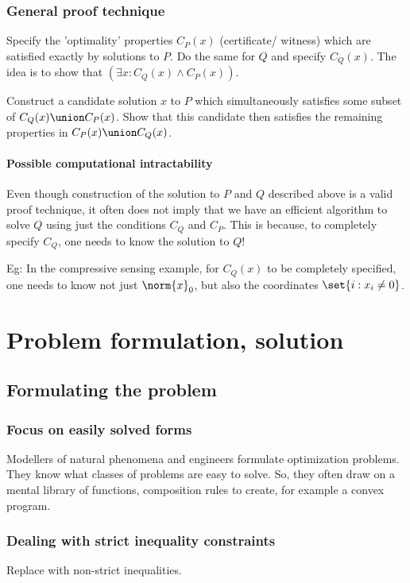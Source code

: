 \documentclass[oneside, article]{memoir}
\begin{document}
\section{General proof technique}
Specify the 'optimality' properties $C_P(x)$ (certificate/ witness) which are satisfied exactly by solutions to $P$. Do the same for $Q$ and specify $C_Q(x)$. The idea is to show that $(\exists x: C_Q(x) \land C_P(x))$.

Construct a candidate solution $x$ to $P$ which simultaneously satisfies some subset of $C_Q(x) \union C_P(x)$. Show that this candidate then satisfies the remaining properties in $C_P(x) \union C_Q(x)$.

\subsection{Possible computational intractability}
Even though construction of the solution to $P$ and $Q$ described above is a valid proof technique, it often does not imply that we have an efficient algorithm to solve $Q$ using just the conditions $C_Q$ and $C_P$. This is because, to completely specify $C_Q$, one needs to know the solution to $Q$!

Eg: In the compressive sensing example, for $C_Q(x)$ to be completely specified, one needs to know not just $\norm{x}_0$, but also the coordinates $\set{i: x_i \neq 0}$.

\part{Problem formulation, solution}
\chapter{Formulating the problem}
\section{Focus on easily solved forms}
Modellers of natural phenomena and engineers formulate optimization problems. They know what classes of problems are easy to solve. So, they often draw on a mental library of functions, composition rules to create, for example a convex program.

\section{Dealing with strict inequality constraints}
Replace with non-strict inequalities.
\end{document}
